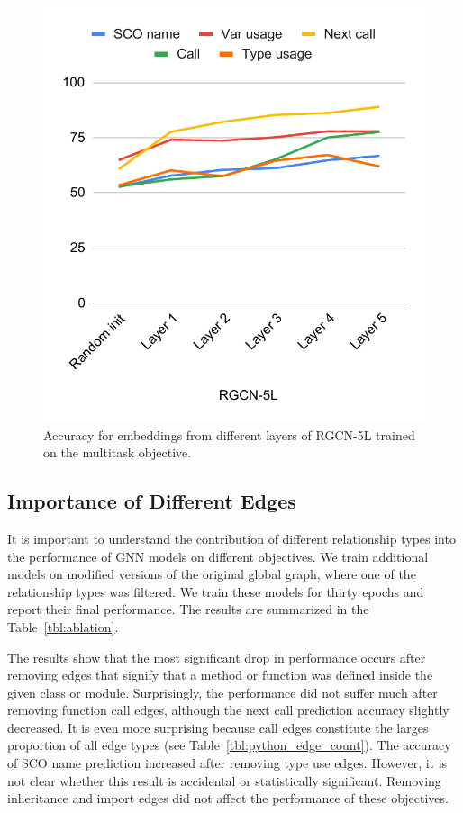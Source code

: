 \documentclass[a4paper,twoside]{article}
\begin{document}
\begin{figure}[]
    \centering
    \includegraphics[width=\columnwidth]{rgcn-5l.pdf}
    \caption{Accuracy for embeddings from different layers of RGCN-5L trained on the multitask objective.}\label{fig:rgcn_layers_5}
\end{figure}

\subsection{Importance of Different Edges}

It is important to understand the contribution of different relationship types into the performance of GNN models on different objectives. We train additional models on modified versions of the original global graph, where one of the relationship types was filtered. We train these models for thirty epochs and report their final performance. The results are summarized in the Table~\ref{tbl:ablation}.

The results show that the most significant drop in performance occurs after removing edges that signify that a method or function was defined inside the given class or module. Surprisingly, the performance did not suffer much after removing function call edges, although the next call prediction accuracy slightly decreased. It is even more surprising because call edges constitute the larges proportion of all edge types (see Table~\ref{tbl:python_edge_count}). The accuracy of SCO name prediction increased after removing type use edges. However, it is not clear whether this result is accidental or statistically significant. Removing inheritance and import edges did not affect the performance of these objectives. 
\end{document}
